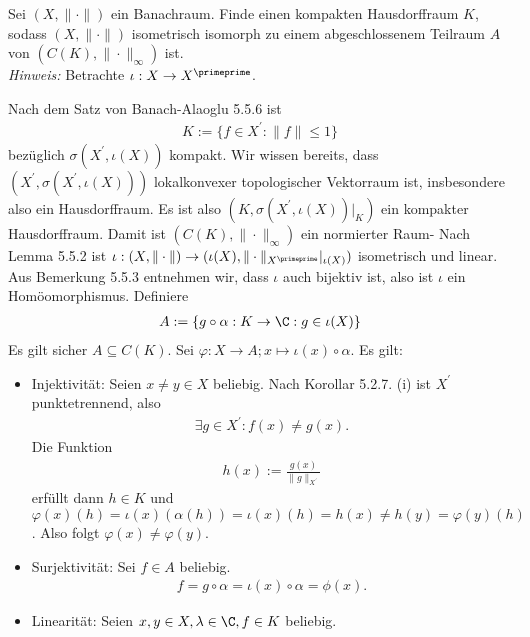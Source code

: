 \begin{exercise}
Sei $(X,\|\cdot\|)$ ein Banachraum. Finde einen kompakten Hausdorffraum $K$, sodass
$(X,\|\cdot\|)$ isometrisch isomorph zu einem abgeschlossenem Teilraum $A$ von
$(C(K),\|\cdot\|_{\infty})$ ist. \\
\textit{Hinweis:} Betrachte $\iota: X \to X^{\primeprime}$.
\end{exercise}
\begin{solution}
Nach dem Satz von Banach-Alaoglu 5.5.6 ist 
\begin{align*}
  K := \{f \in X^{\prime}: \|f\| \leq 1\}
\end{align*}
bezüglich $\sigma(X^{\prime}, \iota(X))$ kompakt.
Wir wissen bereits, dass $(X^{\prime}, \sigma(X^{\prime},\iota(X)))$ lokalkonvexer
topologischer Vektorraum ist, insbesondere also ein Hausdorffraum.
Es ist also $(K, \sigma(X^{\prime},\iota(X))|_K)$ ein kompakter Hausdorffraum.
Damit ist $(C(K), \|\cdot\|_{\infty})$ ein normierter Raum-
Nach Lemma 5.5.2 ist $\iota: (X,\|\cdot\|) \to (\iota(X),\|\cdot\|_{X^{\primeprime}}|_{\iota(X)})$
isometrisch und linear.
Aus Bemerkung 5.5.3 entnehmen wir, dass $\iota$ auch bijektiv ist, also ist $\iota$
ein Homöomorphismus.
Definiere
\begin{align*}
  A := \{g\circ\alpha: K \to \C: g \in \iota(X)\}
\end{align*}
Es gilt sicher $A \subseteq C(K)$.
Sei $\varphi: X \to A; x \mapsto \iota(x) \circ \alpha$.
Es gilt:
\begin{itemize}
  \item Injektivität: Seien $x \neq y \in X$ beliebig. Nach Korollar 5.2.7. (i)
  ist $X^{\prime}$ punktetrennend, also
  \begin{align*}
    \exists g \in X^{\prime}: f(x) \neq g(x).
  \end{align*}
  Die Funktion
  \begin{align*}
    h(x) := \frac{g(x)}{\|g\|_{X^{\prime}}}
  \end{align*}
  erfüllt dann $h \in K$ und $\varphi(x)(h) = \iota(x)(\alpha(h)) = \iota(x)(h) = h(x) \neq h(y) = \varphi(y)(h)$.
  Also folgt $\varphi(x) \neq \varphi(y)$.
  \item Surjektivität: Sei $f \in A$ beliebig. \\
  \begin{align*}
    f = g \circ \alpha = \iota(x) \circ \alpha = \phi(x).
  \end{align*}
  \item Linearität: Seien $x,y \in X, \lambda \in \C, f \in K$ beliebig.

\end{itemize}
\end{solution}

